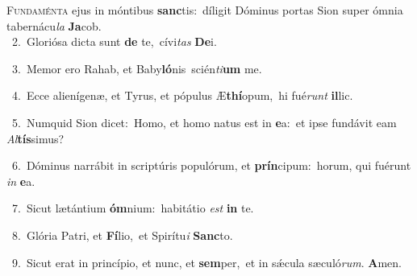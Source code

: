 \lettrine{\initial\textcolor{\initialcolor}{F}}{undaménta} ejus in móntibus \textbf{sanc}\-tis:~\star díligit Dóminus portas Sion super ómnia tabernácu\textit{la} \textbf{Ja}\-cob.\\
{\numbfont\textcolor{\numbcolor}{~2.}}~Gloriósa dicta sunt \textbf{de} te,~\star cívi\textit{tas} \textbf{De}\-i.\par
{\numbfont\textcolor{\numbcolor}{~3.}}~Memor ero Rahab, et Baby\-\textbf{ló}\-nis~\star scién\-\textit{ti}\-\textbf{um} me.\par
{\numbfont\textcolor{\numbcolor}{~4.}}~Ecce alienígenæ, et Tyrus, et pópulus Æ\-\textbf{thí}\-opum,~\star hi fué\textit{runt} \textbf{il}\-lic.\par
{\numbfont\textcolor{\numbcolor}{~5.}}~Numquid Sion dicet:~\dagger Homo, et homo natus est in \textbf{e}\-a:~\star et ipse fundávit eam \textit{Al}\-\textbf{tís}simus?\par
{\numbfont\textcolor{\numbcolor}{~6.}}~Dóminus narrábit in scriptúris populórum, et \textbf{prín}\-cipum:~\star horum, qui fuérunt \textit{in} \textbf{e}\-a.\par
{\numbfont\textcolor{\numbcolor}{~7.}}~Sicut lætántium \textbf{óm}\-nium:~\star habitátio \textit{est} \textbf{in} te.\par
{\numbfont\textcolor{\numbcolor}{~8.}}~Glória Patri, et \textbf{Fí}\-lio,~\star et Spirítu\textit{i} \textbf{Sanc}\-to.\par
{\numbfont\textcolor{\numbcolor}{~9.}}~Sicut erat in princípio, et nunc, et \textbf{sem}\-per,~\star et in sǽcula sæculó\-\textit{rum}\-. \textbf{A}\-men.\par
